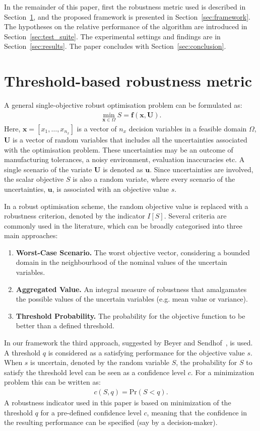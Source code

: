 \documentclass{llncs}
\newcommand{\brr}[1]{{\left({#1}\right)}} %
\newcommand{\I}[1]{I\!\left[{#1}\right]} %
\newcommand{\vx}{\mathbf{x}} %
\newcommand{\vf}{\mathbf{f}} %
\newcommand{\vu}{\mathbf{u}} %
\newcommand{\vU}{\mathbf{U}} %
\begin{document}
In the remainder of this paper, first the robustness metric used is described in Section~\ref{sec:robustness_metric}, and the proposed framework is presented in Section~\ref{sec:framework}. The hypotheses on the relative performance of the algorithm are introduced in Section~\ref{sec:test_suite}. The experimental settings and findings are in Section~\ref{sec:results}. The paper concludes with Section~\ref{sec:conclusion}.

\section{Threshold-based robustness metric}\label{sec:robustness_metric}

A general single-objective robust optimisation problem can be formulated as:
\begin{align}
\min_{\vx\in\Omega} S=\vf\brr{\vx,\vU}.
\label{eq:rev:robust}
\end{align}
Here, $\vx=[x_1,\ldots,x_{n_x}]$ is a vector of $n_x$ decision variables in a feasible domain $\Omega$, $\vU$ is a vector of random variables that includes all the uncertainties associated with the optimisation problem. These uncertainties may be an outcome of manufacturing tolerances, a noisy environment, evaluation inaccuracies etc. A single scenario of the variate $\vU$ is denoted as $\vu$. Since uncertainties are involved, the scalar objective $S$ is also a random variate, where every scenario of the uncertainties, $\vu$, is associated with an objective value $s$.

In a robust optimisation scheme, the random objective value is replaced with a robustness criterion, denoted by the indicator $\I{S}$. Several criteria are commonly used in the literature, which can be broadly categorised into three main approaches:
\begin{enumerate}
\item \textbf{Worst-Case Scenario.} The worst objective vector, considering a bounded domain in the neighbourhood of the nominal values of the uncertain variables.
\item \textbf{Aggregated Value.} An integral measure of robustness that amalgamates the possible values of the uncertain variables (e.g. mean value or variance).
\item \textbf{Threshold Probability.} The probability for the objective function to be better than a defined threshold.
\end{enumerate}

In our framework the third approach, suggested by Beyer and Sendhof~\cite{Beyer2007}, is used. A threshold $q$ is considered as a satisfying performance for the objective value $s$. When $s$ is uncertain, denoted by the random variable $S$, the probability for $S$ to satisfy the threshold level can be seen as a confidence level $c$. For a minimization problem this can be written as:
\begin{align}
c\brr{S,q}=\text{Pr}\brr{S<q}.
\label{eq:confidence}
\end{align}
A robustness indicator used in this paper is based on minimization of the threshold $q$ for a pre-defined confidence level $c$, meaning that the confidence in the resulting performance can be specified (say by a decision-maker).
\end{document}
